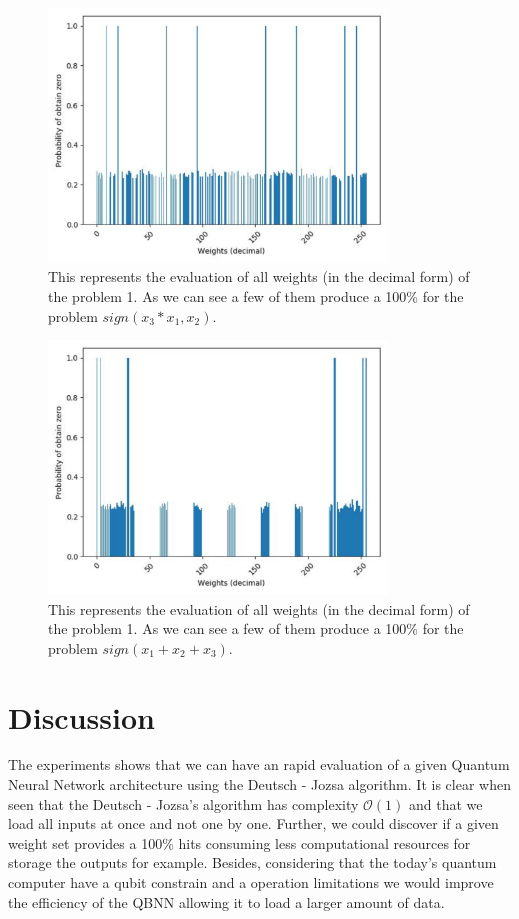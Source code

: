\documentclass[conference]{IEEEtran}
\begin{document}
    \begin{figure}[h!]
    \centering
    \includegraphics[width=9cm, scale=0.4]{images/problem_1.pdf}
    \caption{This represents the evaluation of all weights (in the decimal form) of the problem 1.
    As we can see a few of them produce a 100\% for the problem \(sign(x_3*x_1, x_2)\).}\label{Fig:problem_1}
    \end{figure}

    \begin{figure}[h!]
        \centering
        \includegraphics[width=9cm, scale=0.4]{images/problem_2.pdf}
        \caption{This represents the evaluation of all weights (in the decimal form) of the problem 1.
        As we can see a few of them produce a 100\% for the problem \(sign(x_1 + x_2 + x_3)\).}\label{Fig:problem_2}
    \end{figure}

\section{Discussion}\label{sec:discussion}
 The experiments shows that we can have an rapid evaluation of a given Quantum Neural Network architecture using the
Deutsch - Jozsa algorithm.
It is clear when seen that the Deutsch - Jozsa's algorithm has complexity \(\mathcal{O}(1)\) and that we load all inputs
at once and not one by one.
Further, we could discover if a given weight set provides a 100\% hits consuming less computational resources for storage
the outputs for example.
Besides, considering that the today's quantum computer have a qubit constrain and a operation limitations we would improve the
efficiency of the QBNN allowing it to load a larger amount of data.
\end{document}
